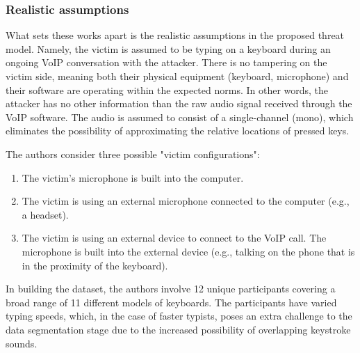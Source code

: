 \documentclass[../main.tex]{subfiles}
\begin{document}
\subsubsection{Realistic assumptions}
What sets these works apart is the realistic assumptions in the proposed threat model. Namely, the victim is assumed to be typing on a keyboard during an ongoing VoIP conversation with the attacker. There is no tampering on the victim side, meaning both their physical equipment (keyboard, microphone) and their software are operating within the expected norms. In other words, the attacker has no other information than the raw audio signal received through the VoIP software. The audio is assumed to consist of a single-channel (mono), which eliminates the possibility of approximating the relative locations of pressed keys.

The authors consider three possible "victim configurations":
\begin{enumerate}
    \item The victim's microphone is built into the computer.
    \item The victim is using an external microphone connected to
    the computer (e.g., a headset).
    \item The victim is using an external device to connect to the
    VoIP call. The microphone is built into the external device
    (e.g., talking on the phone that is in the proximity of the
    keyboard).
\end{enumerate}

In building the dataset, the authors involve 12 unique participants
covering a broad range of 11 different models of keyboards. The participants
have varied typing speeds, which, in the case of faster typists, poses an extra
challenge to the data segmentation stage due to the increased possibility of
overlapping keystroke sounds.
\end{document}
